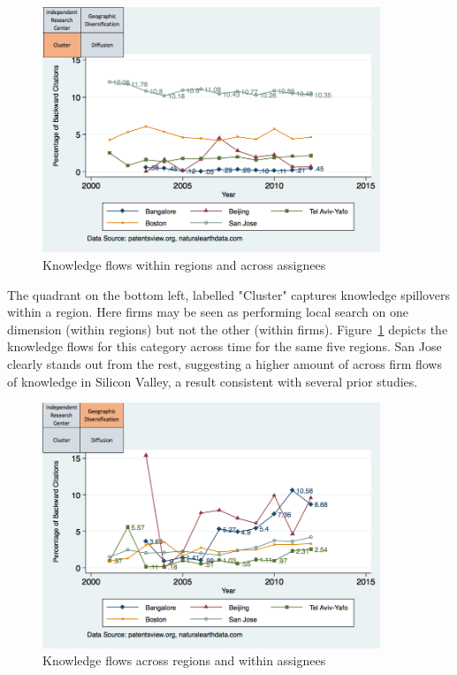 \documentclass[parskip=full,10pt,letterpaper]{article}
\begin{document}
\begin{figure}[h!]
\begin{centering}
  \includegraphics[width=0.90\textwidth]{SMSSameRegionDiffAssigneeFlows}
  \caption{Knowledge flows within regions and across assignees}
  \label{fig:SMSSameRegionDiffAssigneeFlows}
\end{centering}
\end{figure}
The quadrant on the bottom left, labelled "Cluster" captures knowledge spillovers within a region. Here firms may be seen as performing local search on one dimension (within regions) but not the other (within firms). Figure~\ref{fig:SMSSameRegionDiffAssigneeFlows} depicts the knowledge flows for this category across time for the same five regions. San Jose clearly stands out from the rest, suggesting a higher amount of across firm flows of knowledge in Silicon Valley, a result consistent with several prior studies. \par
\begin{figure}[h!]
\begin{centering}
  \includegraphics[width=0.90\textwidth]{SMSDiffRegionSameAssigneeFlows}
  \caption{Knowledge flows across regions and within assignees}
  \label{fig:SMSDiffRegionSameAssigneeFlows}
\end{centering}
\end{figure}
\end{document}
